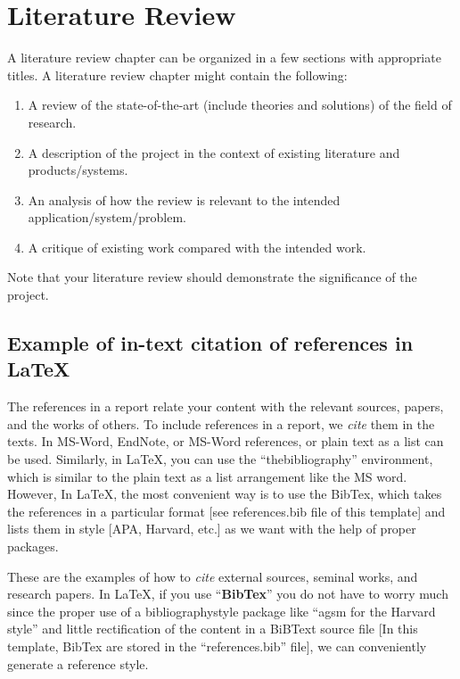 \chapter{Literature Review}
\label{ch:lit_rev} %

A literature review chapter can be organized in a few sections with
appropriate titles. A literature review chapter might  contain the following:
\begin{enumerate}
  \item A review of the state-of-the-art (include theories and
    solutions) of the field of research.
  \item A description of the project in the context of existing
    literature and products/systems.
  \item An analysis of how the review is relevant to the intended
    application/system/problem.
  \item A critique of existing work compared with the intended work.
\end{enumerate}
Note that your literature review should demonstrate the significance
of the project.

\section{Example of in-text citation of references in \LaTeX}
The references in a report relate your content with the relevant
sources, papers, and the works of others. To include references in a
report, we \textit{cite} them in the texts. In MS-Word, EndNote, or
MS-Word references, or plain text as a list can be used. Similarly,
in \LaTeX, you can use the ``thebibliography'' environment, which is
similar to the plain text as a list arrangement like the MS word.
However, In \LaTeX, the most convenient way is to use the BibTex,
which takes the references in a particular format [see references.bib
file of this template] and lists them in style [APA, Harvard, etc.]
as we want with the help of proper packages.

These are the examples of how to \textit{cite} external sources,
seminal works, and research papers. In \LaTeX, if you use
``\textbf{BibTex}'' you do not have to worry much since the proper
use of a bibliographystyle package like ``agsm for the Harvard
style'' and little rectification of the content in a BiBText source
file [In this template, BibTex are stored in the ``references.bib''
file], we can conveniently generate  a reference style.

